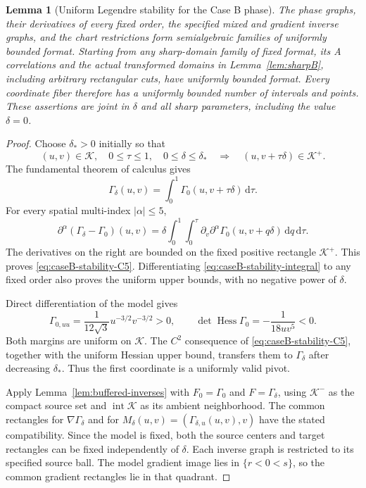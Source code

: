 \documentclass[11pt,a4paper]{article}
\numberwithin{equation}{section}
\newtheorem{lemma}[theorem]{Lemma}
\theoremstyle{remark}
\newcommand{\dd}{\,\mathrm d}
\DeclareMathOperator{\Hess}{Hess}
\begin{document}
\begin{lemma}[Uniform Legendre stability for the Case B phase]
The phase graphs, their derivatives of every fixed order, the specified
mixed and gradient inverse graphs, and the chart restrictions form
semialgebraic families of uniformly bounded format. Starting from any
sharp-domain family of fixed format, its A correlations and the actual
transformed domains in Lemma~\ref{lem:sharpB}, including arbitrary
rectangular cuts, have uniformly bounded format. Every coordinate fiber
therefore has a uniformly bounded number of intervals and points.
These assertions are joint in $\delta$ and all sharp parameters,
including the value $\delta=0$.
\end{lemma}
\begin{proof}
Choose $\delta_*>0$ initially so that
\[
 (u,v)\in\mathcal K,\quad 0\le\tau\le1,\quad
 0\le\delta\le\delta_*
 \quad\Longrightarrow\quad
 (u,v+\tau\delta)\in\mathcal K^+.
\]
The fundamental theorem of calculus gives
\begin{equation}\label{eq:caseB-stability-integral}
 \Gamma_\delta(u,v)=\int_0^1\Gamma_0(u,v+\tau\delta)\dd\tau.
\end{equation}
For every spatial multi-index $|\alpha|\le5$,
\[
 \partial^\alpha(\Gamma_\delta-\Gamma_0)(u,v)
 =\delta\int_0^1\int_0^\tau
   \partial_v\partial^\alpha\Gamma_0(u,v+q\delta)
   \dd q\dd\tau.
\]
The derivatives on the right are bounded on the fixed positive rectangle
$\mathcal K^+$. This proves \eqref{eq:caseB-stability-C5}.
Differentiating \eqref{eq:caseB-stability-integral} to any fixed order
also proves the uniform upper bounds, with no negative power of $\delta$.

Direct differentiation of the model gives
\begin{equation}\label{eq:caseB-stability-Hessian}
 \Gamma_{0,uu}=\frac1{12\sqrt3}u^{-3/2}v^{-3/2}>0,
 \qquad \det\Hess\Gamma_0=-\frac1{18uv^5}<0.
\end{equation}
Both margins are uniform on $\mathcal K$. The $C^2$ consequence of
\eqref{eq:caseB-stability-C5}, together with the uniform Hessian upper
bound, transfers them to $\Gamma_\delta$ after decreasing $\delta_*$.
Thus the first coordinate is a uniformly valid pivot.

Apply Lemma~\ref{lem:buffered-inverses} with $F_0=\Gamma_0$ and
$F=\Gamma_\delta$, using $\mathcal K^-$ as the compact source set and
$\operatorname{int}\mathcal K$ as its ambient neighborhood. The common
rectangles for $\nabla\Gamma_\delta$ and for
$M_\delta(u,v)=(\Gamma_{\delta,u}(u,v),v)$ have the stated compatibility.
Since the model is fixed, both the source centers and target rectangles
can be fixed independently of $\delta$. Each inverse graph is restricted
to its specified source ball. The model gradient image lies in
$\{r<0<s\}$, so the common gradient rectangles lie in that quadrant.


\end{proof}
\end{document}
